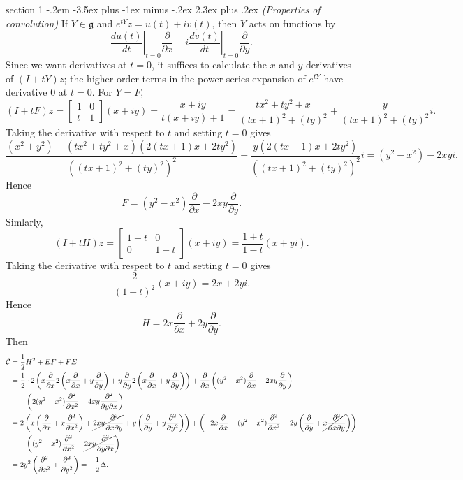 \documentclass[12pt]{article}
\makeatletter
\theoremstyle{norm}
\newcommand{\fg}[0]{\mathfrak{g}}
\providecommand{\cal}[1]{\mathcal{#1}}
\renewcommand{\cal}[1]{\mathcal{#1}}
\newcommand{\rc}[1]{\frac{1}{#1}}
\newcommand{\De}[0]{\Delta}
\newcommand{\pa}[1]{\left( {#1} \right)}
\newcommand{\pd}[2]{\frac{\partial #1}{\partial #2}}
\newcommand{\matt}[4]{
\left[
\begin{matrix}
{#1}&{#2}\\
{#3}&{#4}
\end{matrix}
\right]}
\newenvironment{problem}{\@startsection
       {section}
       {1}
       {-.2em}
       {-3.5ex plus -1ex minus -.2ex}
       {2.3ex plus .2ex}
       {\pagebreak[3]%
       \large\bf\noindent{Problem }
       }
       }
       {%
       }
\makeatother
\begin{document}
\begin{problem}{\it (Properties of convolution)}
If $Y\in \fg$ and $e^{tY}z=u(t)+iv(t)$, then $Y$ acts on functions by
\[
\left.\frac{du(t)}{dt}\right|_{t=0} \pd{}{x} +i\left.\frac{dv(t)}{dt}\right|_{t=0}\pd{}{y}.
\]
Since we want derivatives at $t=0$, it suffices to calculate the $x$ and $y$ derivatives of $(I+tY)z$; the higher order terms in the power series expansion of $e^{tY}$ have derivative 0 at $t=0$. For $Y=F$,
\[
(I+tF)z=\matt 10t1 (x+iy)=\frac{x+iy}{t(x+iy)+1}=\frac{tx^2+ty^2+x}{(tx+1)^2+(ty)^2}+\frac{y}{(tx+1)^2+(ty)^2} i.
\]
Taking the derivative with respect to $t$ and setting $t=0$ gives
\[
\frac{(x^2+y^2)-(tx^2+ty^2+x)(2(tx+1)x+2ty^2)}{((tx+1)^2+(ty)^2)^2}
-\frac{y(2(tx+1)x+2ty^2)}{((tx+1)^2+(ty)^2)^2}i=(y^2-x^2)-2xyi.
\]
Hence
\[
F=(y^2-x^2)\pd{}x-2xy\pd{}y.
\]
Simlarly, 
\[
(I+tH)z=\matt{1+t}00{1-t}(x+iy)=\frac{1+t}{1-t}(x+yi).
\]
Taking the derivative with respect to $t$ and setting $t=0$ gives
\[
\frac{2}{(1-t)^2}(x+iy)=2x+2yi.
\]
Hence
\[
H=2x\pd{}x+2y\pd{}y.
\]
Then
{\small
\begin{align*}
\cal C&=\rc 2 H^2+EF+FE\\
&=\rc2\cdot 2\pa{
x\pd{}x2\pa{x\pd{}x+y\pd{}y}
+y\pd{}y2\pa{x\pd{}x+y\pd{}y}
}
+\pd{}x\pa{
(y^2-x^2)\pd{}x-2xy\pd{}y
}\\
&\quad +\pa{2(y^2-x^2)\pd{^2}{x^2}-4xy\pd{^2}{y\partial x}}\\
&=2\pa{
x\pa{\pd{}x+x\pd{^2}{x^2}}
+\cancel{2xy\pd{^2}{x\partial y}}
+y\pa{\pd{}y+y\pd{^2}{y^2}}
}
+\pa{-2x\pd{}{x}+(y^2-x^2)\pd{^2}{x^2}-2y\pa{\pd{}y+\cancel{x\pd{^2}{x\partial y}}}}\\
&\quad+\pa{(y^2-x^2)\pd{^2}{x^2}-\cancel{2xy\pd{^2}{y\partial x}}}\\
&=2y^2\pa{\pd{^2}{x^2}+\pd{^2}{y^2}}=-\rc{2}\De.
\end{align*}}
\end{problem}
\end{document}
